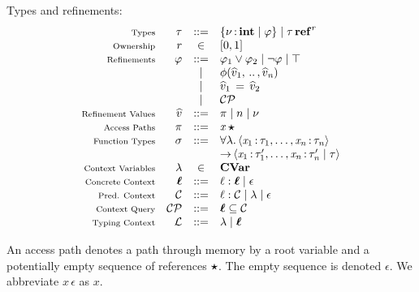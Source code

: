 \documentclass[runningheads]{llncs}
\begin{document}
Types and refinements:
\[
  \begin{array}{rrcl}
      \text{\scriptsize Types} & \tau %
                                         &::=&  \set{  \nu  \COL \TINT \mid  \varphi }  \mid  \tau  \TREF^{ r }  \\
      \text{\scriptsize Ownership} & r & \in & [0,1] \\
      \text{\scriptsize Refinements} & \varphi & ::= & \varphi_{{\mathrm{1}}}  \vee  \varphi_{{\mathrm{2}}} \mid  \neg  \varphi  \mid  \top  \\
                               & & \mid & \phi  \ottsym{(}  \widehat{v}_{{\mathrm{1}}}  \ottsym{,} \, .. \, \ottsym{,}  \widehat{v}_{\ottmv{n}}  \ottsym{)} \\
                               & & \mid & \widehat{v}_{{\mathrm{1}}} \, \ottsym{=} \, \widehat{v}_{{\mathrm{2}}} \\
                                 & & \mid & \mathcal{CP} \\
    \text{\scriptsize Refinement Values} & \widehat{v} & ::= & \pi \mid n \mid \nu \\
    \text{\scriptsize Access Paths} & \pi & ::= & \mathit{x} \, \oldvec{\star} \\
    \text{\scriptsize Function Types} & \sigma & ::= &  \forall  \lambda .\tuple{ \mathit{x_{{\mathrm{1}}}} \COL \tau_{{\mathrm{1}}} ,\dots, \mathit{x_{\ottmv{n}}} \COL \tau_{\ottmv{n}} } \\ & & & \ra\tuple{ \mathit{x_{{\mathrm{1}}}} \COL \tau'_{{\mathrm{1}}} ,\dots, \mathit{x_{\ottmv{n}}} \COL \tau'_{\ottmv{n}}  \mid  \tau }  \\
    \text{\scriptsize Context Variables} & \lambda & \in & \CVar \\
    \text{\scriptsize Concrete Context} & \oldvec{\ell} & ::= & \ell  \ottsym{:}  \oldvec{\ell} \mid  \epsilon  \\
    \text{\scriptsize Pred. Context} & \mathcal{C} & ::= &  \ell  :  \mathcal{C}  \mid \lambda \mid  \epsilon  \\
    \text{\scriptsize Context Query} & \mathcal{CP} & ::= &   \oldvec{\ell}     \subseteq    \mathcal{C}  \\
    \text{\scriptsize Typing Context} & \mathcal{L} & ::= & \lambda \mid \oldvec{\ell} \\
  \end{array}
\]

An access path denotes a path through memory by a root variable and a potentially empty sequence of references $\oldvec{\star}$.
The empty sequence is denoted $ \epsilon $. We abbreviate $\mathit{x} \,  \epsilon $ as $\mathit{x}$.
\end{document}
